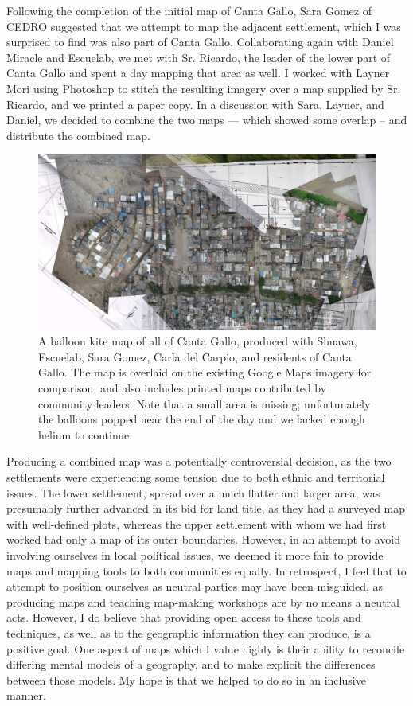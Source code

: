 \documentclass[11pt,oneside,notitlepage]{report}
\begin{document}
Following the completion of the initial map of Canta Gallo, Sara Gomez of CEDRO suggested that we attempt to map the adjacent settlement, which I was surprised to find was also part of Canta Gallo. Collaborating again with Daniel Miracle and Escuelab, we met with Sr. Ricardo, the leader of the lower part of Canta Gallo and spent a day mapping that area as well. I worked with Layner Mori using Photoshop to stitch the resulting imagery over a map supplied by Sr. Ricardo, and we printed a paper copy. In a discussion with Sara, Layner, and Daniel, we decided to combine the two maps --- which showed some overlap -- and distribute the combined map. 

\begin{figure}[h]
  \begin{center}
	\includegraphics[width=1\textwidth]{images/cantagallo-combined.jpg}
	\caption{A balloon kite map of all of Canta Gallo, produced with Shuawa, Escuelab, Sara Gomez, Carla del Carpio, and residents of Canta Gallo. The map is overlaid on the existing Google Maps imagery for comparison, and also includes printed maps contributed by community leaders. Note that a small area is missing; unfortunately the balloons popped near the end of the day and we lacked enough helium to continue.}
  \end{center}
\end{figure}

Producing a combined map was a potentially controversial decision, as the two settlements were experiencing some tension due to both ethnic and territorial issues. The lower settlement, spread over a much flatter and larger area, was presumably further advanced in its bid for land title, as they had a surveyed map with well-defined plots, whereas the upper settlement with whom we had first worked had only a map of its outer boundaries. However, in an attempt to avoid involving ourselves in local political issues, we deemed it more fair to provide maps and mapping tools to both communities equally. In retrospect, I feel that to attempt to position ourselves as neutral parties may have been misguided, as producing maps and teaching map-making workshops are by no means a neutral acts. However, I do believe that providing open access to these tools and techniques, as well as to the geographic information they can produce, is a positive goal. One aspect of maps which I value highly is their ability to reconcile differing mental models of a geography, and to make explicit the differences between those models. My hope is that we helped to do so in an inclusive manner. 
\end{document}
